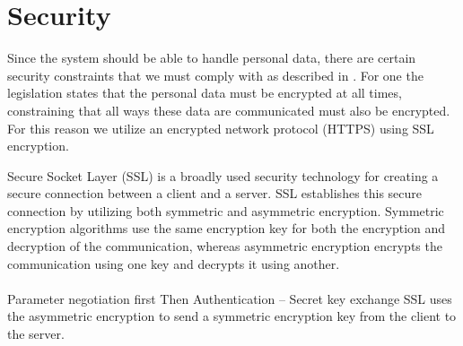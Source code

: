 \section{Security}


Since the system should be able to handle personal data, there are certain security constraints that we must comply with as described in . For one the legislation states that the personal data must be encrypted at all times, constraining that all ways these data are communicated must also be encrypted. For this reason we utilize an encrypted network protocol (HTTPS) using SSL encryption.


Secure Socket Layer (SSL) is a broadly used security technology for creating a secure connection between a client and a server. SSL establishes this secure connection by utilizing both symmetric and asymmetric encryption. Symmetric encryption algorithms use the same encryption key for both the encryption and decryption of the communication, whereas asymmetric encryption encrypts the communication using one key and decrypts it using another. 
\\\\
Parameter negotiation first
Then Authentication --
Secret key exchange
%
SSL uses the asymmetric encryption to send a symmetric encryption key from the client to the server. 



